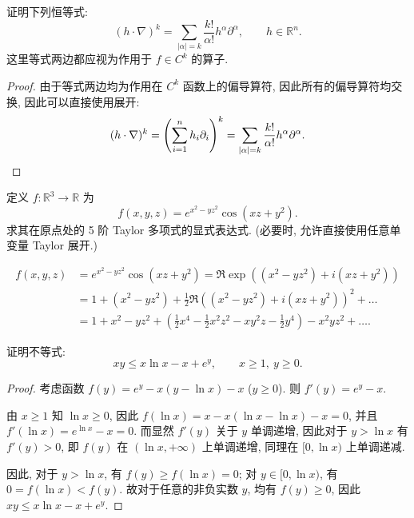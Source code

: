 \documentclass{article}
\begin{document}
\begin{problem}
  证明下列恒等式:
  \[
    (h\cdot\nabla)^k=\sum_{|\alpha|=k}\frac{k!}{\alpha!}h^\alpha\partial^\alpha,\qquad h\in\mathbb{R}^n.
  \]
  这里等式两边都应视为作用于 $f\in C^k$ 的算子.
\end{problem}

\begin{proof}
	由于等式两边均为作用在 $C^k$ 函数上的偏导算符, 因此所有的偏导算符均交换, 因此可以直接使用展开: 
	\[ (h \cdot \nabla)^k = \left( \sum_{i=1}^{n}h_i \partial_i \right)^k = \sum_{\left|\alpha\right| = k}^{}\frac{k!}{\alpha!} h^\alpha \partial^\alpha. \]
\end{proof}



\begin{problem}
  定义 $f:\mathbb{R}^3\to\mathbb{R}$ 为
  \[
    f(x,y,z)=e^{x^2-yz^2}\cos(xz+y^2).
  \]
  求其在原点处的 5 阶 Taylor 多项式的显式表达式. (必要时, 允许直接使用任意单变量 Taylor 展开.)
\end{problem}

\begin{solution}
	\begin{align*}
		f(x,y,z)
		&= e^{x^2-yz^2} \cos(xz+y^2) 
		= \Re \exp\left( (x^2-yz^2) + i (xz+y^2) \right) \\
		&= 1 + (x^2 - yz^2) + \frac{1}{2} \Re \left( (x^2-yz^2) + i (xz+y^2) \right)^2 + \dots \\
		&= 1 + x^2 -yz^2 + \left( \frac{1}{2} x^4 - \frac{1}{2} x^2 z^2 - xy^2 z - \frac{1}{2} y^4 \right) -x^2yz^2 + \dots .
	\end{align*}
\end{solution}



\begin{problem}
  证明不等式:
  \[
    xy\leq x\ln x-x+e^y,\qquad x\geq1,\ y\geq0.
  \]
\end{problem}

\begin{proof}
	考虑函数 $f(y) = e^{y} - x(y - \ln x) - x$ ($y \ge 0$). 则 $f'(y) = e^y - x$.

	由 $x \ge 1$ 知 $\ln x \ge 0$, 因此 $f(\ln x) = x - x (\ln x - \ln x) - x = 0$, 并且 $f'(\ln x) = e^{\ln x} - x = 0$. 而显然 $f'(y)$ 关于 $y$ 单调递增, 因此对于 $y>\ln x$ 有 $f'(y) > 0$, 即 $f(y)$ 在 $(\ln x, +\infty)$ 上单调递增, 同理在 $[0, \ln x)$ 上单调递减.

	因此, 对于 $y> \ln x$, 有 $f(y) \ge f(\ln x) = 0$; 对 $y \in [0, \ln x)$, 有 $0 = f(\ln x) < f(y)$. 故对于任意的非负实数 $y$, 均有 $f(y) \ge 0$, 因此 $xy \le x \ln x - x + e^{y}$. 
\end{proof}
\end{document}
